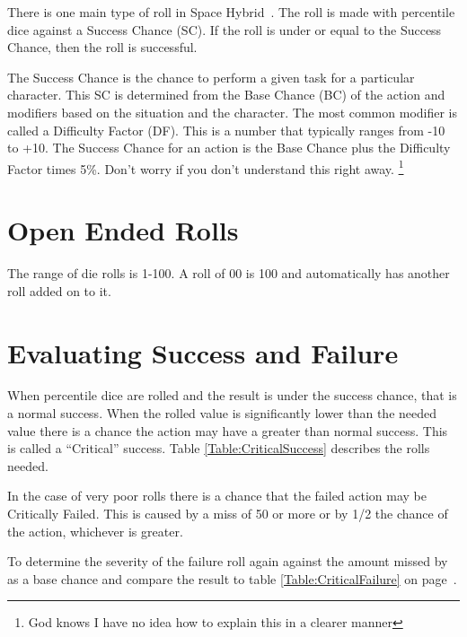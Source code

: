 There is one main type of roll in Space Hybrid\ . The roll is 
made with percentile dice against a Success Chance (SC). If the roll 
is under or equal to the Success Chance, then the roll is successful.

The Success Chance is the chance to perform a given task for a particular
character. This SC is determined from the Base Chance (BC) of the action 
and modifiers based on the situation and the character. The most common 
modifier is called a Difficulty Factor (DF). This is a number that typically 
ranges from -10 to +10. The Success Chance for an action is the Base Chance plus 
the Difficulty Factor times 5\%. Don't worry if you don't understand 
this right away. \footnote{God knows I have no idea how to explain 
this in a clearer manner}

\section{Open Ended Rolls}

The range of die rolls is 1-100. A roll of 00 is 100 and 
automatically has another roll added on to it.

\section{Evaluating Success and Failure}

When percentile dice are rolled and the result is under the success chance, that
is a normal success. When the rolled value is significantly lower than the needed 
value there is a chance the action may have a greater than normal success. This is 
called a ``Critical'' success. Table \ref{Table:CriticalSuccess} describes the 
rolls needed.



In the case of very poor rolls there is a chance that the failed action 
may be Critically Failed. This is caused by a miss of 50 or more or by 
1/2 the chance of the action, whichever is greater.

To determine the severity of the failure roll again against the 
amount missed by as a base chance and compare the result to table 
\ref{Table:CriticalFailure} on page~\pageref{Table:CriticalFailure}.


